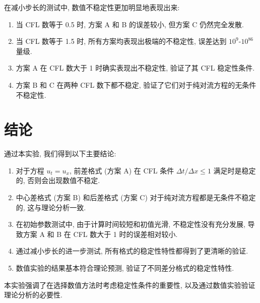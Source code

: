 \documentclass[12pt]{article}
\begin{document}
            在减小步长的测试中, 数值不稳定性更加明显地表现出来:

            \begin{enumerate}
                \item 当 CFL 数等于 0.5 时, 方案 A 和 B 的误差较小, 但方案 C 仍然完全发散.
                \item 当 CFL 数等于 1.5 时, 所有方案均表现出极端的不稳定性, 误差达到 $10^9$-$10^{86}$ 量级.
                \item 方案 A 在 CFL 数大于 1 时确实表现出不稳定性, 验证了其 CFL 稳定性条件.
                \item 方案 B 和 C 在两种 CFL 数下都不稳定, 验证了它们对于纯对流方程的无条件不稳定性.
            \end{enumerate}

    \section{结论}
        通过本实验, 我们得到以下主要结论:

        \begin{enumerate}
            \item 对于方程 $u_t = u_x$, 前差格式 (方案 A) 在 CFL 条件 $\Delta t / \Delta x \leq 1$ 满足时是稳定的, 否则会出现数值不稳定.
            \item 中心差格式 (方案 B) 和后差格式 (方案 C) 对于纯对流方程都是无条件不稳定的, 这与理论分析一致.
            \item 在初始参数测试中, 由于计算时间较短和初值光滑, 不稳定性没有充分发展, 导致方案 A 和 B 在 CFL 数大于 1 时的误差相对较小.
            \item 通过减小步长的进一步测试, 所有格式的稳定性特性都得到了更清晰的验证.
            \item 数值实验的结果基本符合理论预测, 验证了不同差分格式的稳定性特性.
        \end{enumerate}

        本实验强调了在选择数值方法时考虑稳定性条件的重要性, 以及通过数值实验验证理论分析的必要性.
\end{document}

